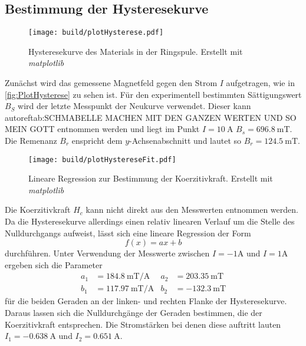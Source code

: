 \subsection{Bestimmung der Hysteresekurve}
\label{A_Hysterese}

\begin{figure}
    \centering
    \caption{Hysteresekurve des Materials in der Ringspule. Erstellt mit \textit{matplotlib} \cite{matplotlib}}
    \label{fig:PlotHysterese}
    \texttt{[image: build/plotHysterese.pdf]}
\end{figure}

Zunächst wird das gemessene Magnetfeld gegen den Strom $I$ aufgetragen, wie in \autoref{fig:PlotHysterese} zu sehen ist. Für den experimentell bestimmten
Sättigungswert $B_S$ wird der letzte Messpunkt der Neukurve verwendet. Dieser kann autoref{tab:SCHMABELLE MACHEN MIT DEN GANZEN WERTEN UND SO MEIN GOTT} entnommen werden und
liegt im Punkt $I = 10\:\unit{\ampere}$ $B_s = 696.8\:\unit{\milli\tesla}$.
Die Remenanz $B_r$ enspricht dem $y$-Achsenabschnitt und lautet so $ B_r = 124.5 \:\unit{\milli\tesla}$.
\begin{figure}
    \centering
    \caption{Lineare Regression zur Bestimmung der Koerzitivkraft. Erstellt mit \textit{matplotlib} \cite{matplotlib}}
    \label{fig:PlotHystereseFit}
    \texttt{[image: build/plotHystereseFit.pdf]}
\end{figure}
Die Koerzitivkraft $H_c$ kann nicht direkt aus den Messwerten entnommen werden. Da die Hysteresekurve allerdings einen relativ linearen Verlauf um die Stelle des Nulldurchgangs 
aufweist, lässt sich eine lineare Regression der Form
\begin{equation*}
    f(x) = ax + b
\end{equation*}
durchführen. Unter Verwendung der Messwerte zwischen $I = -1 \unit{\ampere}$ und $I = 1 \unit{\ampere}$ ergeben sich die Parameter
\begin{align*}
    a_1 &= 184.8 \: \unit{\milli\tesla\per\ampere}    &   a_2 &= 203.35\: \unit{\milli\tesla}   \\  
    b_1 &= 117.97\: \unit{\milli\tesla\per\ampere}    &   b_2 &= -132.3\: \unit{\milli\tesla}
\end{align*}
für die beiden Geraden an der linken- und rechten Flanke der Hysteresekurve. Daraus lassen sich die Nulldurchgänge der Geraden bestimmen, die der Koerzitivkraft entsprechen. 
Die Stromstärken bei denen diese auftritt lauten $I_1 = -0.638 \: \unit{\ampere}$ und $I_2 = 0.651 \: \unit{\ampere}$.
